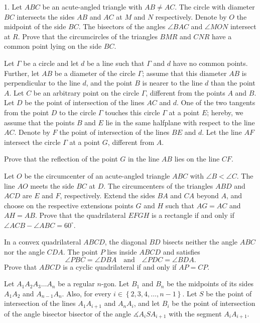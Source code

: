 \item[\textbf{G1.}]1. Let $ABC$ be an acute-angled triangle with $AB\neq AC$. The circle with diameter $BC$ intersects the sides $AB$ and $AC$ at $M$ and $N$ respectively. Denote by $O$ the midpoint of the side $BC$. The bisectors of the angles $\angle BAC$ and $\angle MON$ intersect at $R$. Prove that the circumcircles of the triangles $BMR$ and $CNR$ have a common point lying on the side $BC$.

\item[\textbf{G2.}]Let $\Gamma$ be a circle and let $d$ be a line such that $\Gamma$ and $d$ have no common points. Further, let $AB$ be a diameter of the circle $\Gamma$; assume that this diameter $AB$ is perpendicular to the line $d$,  and the point $B$ is nearer to the line $d$ than the point $A$. Let $C$ be an arbitrary point on the circle $\Gamma$,  different from the points $A$ and $B$. Let $D$ be the point of intersection of the lines $AC$ and $d$. One of the two tangents from the point $D$ to the circle $\Gamma$ touches this circle $\Gamma$ at a point $E$; hereby, we assume that the points $B$ and $E$ lie in the same halfplane with respect to the line $AC$. Denote by $F$ the point of intersection of the lines $BE$ and $d$. Let the line $AF$ intersect the circle $\Gamma$ at a point $G$,  different from $A$.

Prove that the reflection of the point $G$ in the line $AB$ lies on the line $CF$.

\item[\textbf{G3.}]Let $O$ be the circumcenter of an acute-angled triangle $ABC$ with ${\angle B<\angle C}$. The line $AO$ meets the side $BC$ at $D$. The circumcenters of the triangles $ABD$ and $ACD$ are $E$ and $F$,  respectively. Extend the sides $BA$ and $CA$ beyond $A$,  and choose on the respective extensions points $G$ and $H$ such that ${AG=AC}$ and ${AH=AB}$. Prove that the quadrilateral $EFGH$ is a rectangle if and only if ${\angle ACB-\angle ABC=60^{\circ }}$.

\item[\textbf{G4.}]In a convex quadrilateral $ABCD$,  the diagonal $BD$ bisects neither the angle $ABC$ nor the angle $CDA$. The point $P$ lies inside $ABCD$ and satisfies \[\angle PBC=\angle DBA\quad\text{and}\quad \angle PDC=\angle BDA.\] Prove that $ABCD$ is a cyclic quadrilateral if and only if $AP=CP$.

\item[\textbf{G5.}]Let $A_1A_2A_3\ldots A_n$ be a regular $n$-gon. Let $B_1$ and $B_n$ be the midpoints of its sides $A_1A_2$ and $A_{n-1}A_n$. Also, for every $i\in\left\{2,3,4,\ldots ,n-1\right\}$. Let $S$ be the point of intersection of the lines $A_1A_{i+1}$ and $A_nA_i$,  and let $B_i$ be the point of intersection of the angle bisector bisector of the angle $\measuredangle A_iSA_{i+1}$ with the segment $A_iA_{i+1}$.

